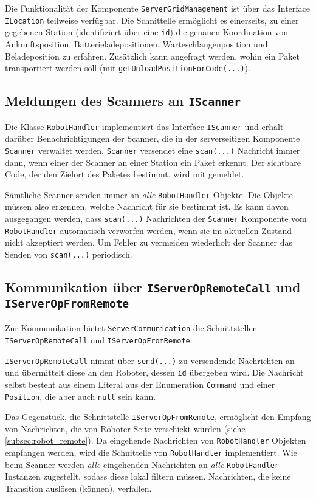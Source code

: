 Die Funktionalität der Komponente \texttt{ServerGridManagement} ist über das Interface \texttt{ILocation} teilweise verfügbar. Die Schnittelle ermöglicht es einerseits, zu einer gegebenen Station (identifiziert über eine \texttt{id}) die genauen Koordination von Ankunftsposition, Batterieladepositionen, Warteschlangenposition und Beladeposition zu erfahren.
Zusätzlich kann angefragt werden, wohin ein Paket transportiert werden soll (mit \texttt{getUnloadPositionForCode(...)}).



\subsection{Meldungen des Scanners an \texttt{IScanner}}

Die Klasse \texttt{RobotHandler} implementiert das Interface \texttt{IScanner} und erhält darüber Benachrichtigungen der Scanner, die in der serverseitigen Komponente \texttt{Scanner} verwaltet werden. \texttt{Scanner} versendet eine \texttt{scan(...)} Nachricht immer dann, wenn einer der Scanner an einer Station ein Paket erkennt. Der sichtbare Code, der den Zielort des Paketes bestimmt, wird mit gemeldet.

Sämtliche Scanner senden immer an \emph{alle} \texttt{RobotHandler} Objekte. Die Objekte müssen also erkennen, welche Nachricht für sie bestimmt ist. Es kann davon ausgegangen werden, dass \texttt{scan(...)} Nachrichten der \texttt{Scanner} Komponente vom \texttt{RobotHandler} automatisch verworfen werden, wenn sie im aktuellen Zustand nicht akzeptiert werden.
Um Fehler zu vermeiden wiederholt der Scanner das Senden von \texttt{scan(...)} periodisch. 




\subsection{Kommunikation über \texttt{IServerOpRemoteCall} und \texttt{IServerOpFromRemote}}
\label{subsec:robot_remote}

Zur Kommunikation bietet \texttt{ServerCommunication} die Schnittstellen \texttt{IServerOpRemoteCall} und \texttt{IServerOpFromRemote}.

\texttt{IServerOpRemoteCall} nimmt über \texttt{send(...)} zu versendende Nachrichten an und übermittelt diese an den Roboter, dessen \texttt{id} übergeben wird.
Die Nachricht selbst besteht aus einem Literal aus der Enumeration \texttt{Command} und einer \texttt{Position}, die aber auch \texttt{null} sein kann.

Das Gegenstück, die Schnittstelle \texttt{IServerOpFromRemote}, ermöglicht den Empfang von Nachrichten, die von Roboter-Seite verschickt wurden (siehe \autoref{subsec:robot_remote}). Da eingehende Nachrichten von \texttt{RobotHandler} Objekten empfangen werden, wird die Schnittelle von \texttt{RobotHandler} implementiert.
Wie beim Scanner werden \emph{alle} eingehenden Nachrichten an \emph{alle} \texttt{RobotHandler} Instanzen zugestellt, sodass diese lokal filtern müssen.
Nachrichten, die keine Transition auslösen (können), verfallen.